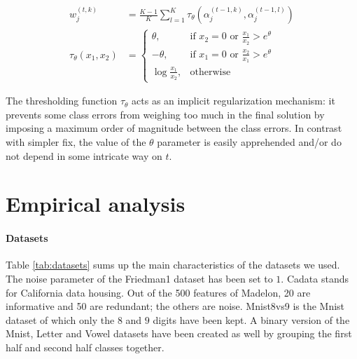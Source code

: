 \documentclass{article}
\begin{document}
\begin{align}\label{eq:METrimmed}
w_j^{(t,k)} &= \frac{K-1}{K} \sum_{l=1}^{K} \tau_{\theta} \left(\alpha_j^{(t-1, 
k)},  \alpha_j^{(t-1, l)}\right)\\
\tau_{\theta}(x_1, x_2) &=\begin{cases}
    \theta, & \text{if $x_2 = 0$ or $\frac{x_1}{x_2} > e^{\theta}$}\\
    -\theta,& \text{if $x_1 = 0$ or $\frac{x_2}{x_1} > e^{\theta}$}\\
    \log \frac{x_1}{x_2}, & \text{otherwise}
  \end{cases}
\end{align}

The thresholding function $\tau_{\theta}$ acts as an implicit regularization 
mechanism: it prevents some class errors from weighing too much in the final 
solution by imposing a maximum order of magnitude between the class errors. In 
contrast with simpler fix, the value of the  $\theta$ parameter is easily 
apprehended and/or do not depend in some intricate way on $t$.




\section{Empirical analysis}
\label{sec:analysis}

\paragraph{Datasets}
Table \ref{tab:datasets} sums up the main characteristics of the datasets we 
used. The noise parameter of the Friedman1 dataset has been set to $1$. Cadata 
stands for California data housing. Out of the 500 features of Madelon, 20 are 
informative and 50 are redundant; the others are noise. Mnist8vs9 is the Mnist 
dataset of which only the $8$ and $9$ digits have been kept. A binary version 
of the Mnist, Letter and Vowel datasets have been created as well by grouping 
the first half and second half classes together.
\end{document}
